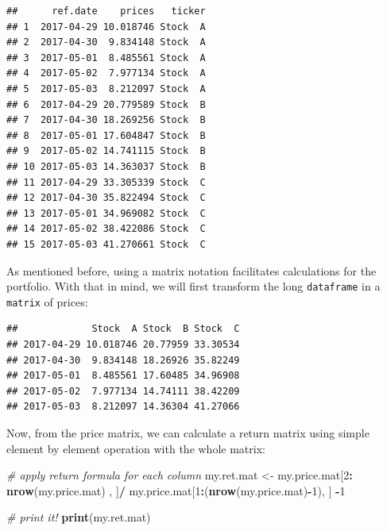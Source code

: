 \documentclass[11pt,]{book}
\newenvironment{Shaded}{\begin{snugshade}}{\end{snugshade}}
\newcommand{\KeywordTok}[1]{\textcolor[rgb]{0.27,0.27,0.27}{\textbf{#1}}}
\newcommand{\DataTypeTok}[1]{\textcolor[rgb]{0.27,0.27,0.27}{#1}}
\newcommand{\DecValTok}[1]{\textcolor[rgb]{0.06,0.06,0.06}{#1}}
\newcommand{\StringTok}[1]{\textcolor[rgb]{0.5,0.5,0.5}{#1}}
\newcommand{\CommentTok}[1]{\textcolor[rgb]{0.56,0.35,0.01}{\textit{#1}}}
\newcommand{\OperatorTok}[1]{\textcolor[rgb]{0.81,0.36,0.00}{\textbf{#1}}}
\newcommand{\NormalTok}[1]{#1}
\begin{document}
\begin{verbatim}
##      ref.date    prices   ticker
## 1  2017-04-29 10.018746 Stock  A
## 2  2017-04-30  9.834148 Stock  A
## 3  2017-05-01  8.485561 Stock  A
## 4  2017-05-02  7.977134 Stock  A
## 5  2017-05-03  8.212097 Stock  A
## 6  2017-04-29 20.779589 Stock  B
## 7  2017-04-30 18.269256 Stock  B
## 8  2017-05-01 17.604847 Stock  B
## 9  2017-05-02 14.741115 Stock  B
## 10 2017-05-03 14.363037 Stock  B
## 11 2017-04-29 33.305339 Stock  C
## 12 2017-04-30 35.822494 Stock  C
## 13 2017-05-01 34.969082 Stock  C
## 14 2017-05-02 38.422086 Stock  C
## 15 2017-05-03 41.270661 Stock  C
\end{verbatim}

As mentioned before, using a matrix notation facilitates calculations
for the portfolio. With that in mind, we will first transform the long
\texttt{dataframe} in a \texttt{matrix} of prices:

\begin{Shaded}
\end{Shaded}

\begin{verbatim}
##             Stock  A Stock  B Stock  C
## 2017-04-29 10.018746 20.77959 33.30534
## 2017-04-30  9.834148 18.26926 35.82249
## 2017-05-01  8.485561 17.60485 34.96908
## 2017-05-02  7.977134 14.74111 38.42209
## 2017-05-03  8.212097 14.36304 41.27066
\end{verbatim}

Now, from the price matrix, we can calculate a return matrix using
simple element by element operation with the whole matrix:

\begin{Shaded}
\begin{Highlighting}[]
\CommentTok{# apply return formula for each column}
\NormalTok{my.ret.mat <-}\StringTok{ }\NormalTok{my.price.mat[}\DecValTok{2}\OperatorTok{:}\StringTok{ }\KeywordTok{nrow}\NormalTok{(my.price.mat)   , ]}\OperatorTok{/}
\StringTok{              }\NormalTok{my.price.mat[}\DecValTok{1}\OperatorTok{:}\NormalTok{(}\KeywordTok{nrow}\NormalTok{(my.price.mat)}\OperatorTok{-}\DecValTok{1}\NormalTok{), ] }\OperatorTok{-}\DecValTok{1} 

\CommentTok{# print it!}
\KeywordTok{print}\NormalTok{(my.ret.mat)}
\end{Highlighting}
\end{Shaded}
\end{document}
